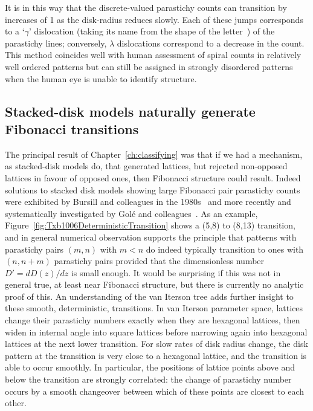 It is in this way that the discrete-valued parastichy counts can transition by increases of 1 as the disk-radius reduces slowly. 
	 Each of these jumps corresponds to a `$\gamma$' dislocation (taking its name from the shape of the letter~\cite{zagorska-marekPhyllotacticPatternsTransitions1985}) of the parastichy lines; conversely, $\lambda$ dislocations correspond to a decrease in the count.
This method coincides well with human assessment of spiral counts in relatively well ordered patterns but can still be assigned in strongly disordered patterns when the human eye is unable to identify structure. 


\subsection{Stacked-disk models naturally generate Fibonacci transitions}


The principal result of Chapter~\ref{ch:classifying} was that if we had a mechanism, as stacked-disk models do, that generated lattices, but rejected non-opposed lattices in favour of opposed ones, then Fibonacci structure could result.   
Indeed solutions to stacked disk models showing large Fibonacci pair parastichy counts were exhibited by Bursill and colleagues in the 1980s~\cite{bursillSpiralLatticeConcepts1987} and more recently and systematically investigated by Gol\'e and colleagues~\cite{goleFibonacciQuasisymmetricPhyllotaxis2016}.
 As an example, Figure~\ref{fig:Txb1006DeterministicTransition} shows a (5,8) to (8,13) transition, and in general numerical observation supports the principle that patterns with parastichy pairs $(m,n)$ with $m<n$ do indeed typically transition to ones with $(n,n+m)$ parastichy pairs provided that the dimensionless number $D'=dD(z)/dz$ is small enough. It would be surprising if this was not in general true, at least near Fibonacci structure, but there is currently no analytic proof of this.
 An understanding of the van Iterson tree adds further insight to these smooth, deterministic, transitions. In van Iterson parameter space, lattices change their parastichy numbers exactly when they are hexagonal lattices, then widen in internal angle into square lattices before narrowing again into hexagonal lattices at the next lower transition.  For slow rates of disk radius change, the disk pattern at the transition is very close to a hexagonal lattice, and the transition is able to occur smoothly. In particular, the positions of lattice points above and below the transition are strongly correlated: the change of parastichy number occurs by a smooth changeover between which of these points are closest to each other. 
 

